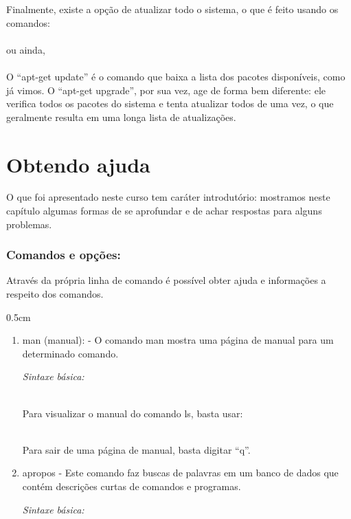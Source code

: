 \begin{refsection}
Finalmente, existe a opção de atualizar todo o sistema, o que é feito usando os comandos:\\
\\
 ou ainda,\\
\\

O ``apt-get update'' é o comando que baixa a lista dos pacotes disponíveis, como já vimos. O ``apt-get upgrade'', por sua vez, age de forma bem diferente: ele verifica todos os pacotes do sistema e tenta atualizar todos de uma vez, o que geralmente resulta em uma longa lista de atualizações.\\

\section{Obtendo ajuda}\label{tut1:help}
O que foi apresentado neste curso tem caráter introdutório: mostramos neste capítulo algumas formas de se aprofundar e de achar respostas para alguns problemas.\\

 \subsubsection{Comandos e opções:}\label{tut1:help:comandos}

Através da própria linha de comando é possível obter ajuda e informações a respeito dos comandos.\\
  \begin {myindentpar}{0.5cm}
  \begin{enumerate}[\itshape i.]

 \item{man (manual):} - O comando man mostra uma página de manual para um determinado comando.

\textit{Sintaxe básica:}

\\
 Para visualizar o manual do comando ls, basta usar:

\\
Para sair de uma página de manual, basta digitar ``q''.

\item{apropos} - Este comando faz buscas de palavras em um banco de dados que contém descrições curtas de comandos e programas.

\textit{Sintaxe básica:}


\end{enumerate}
\end{myindentpar}
\end{refsection}
